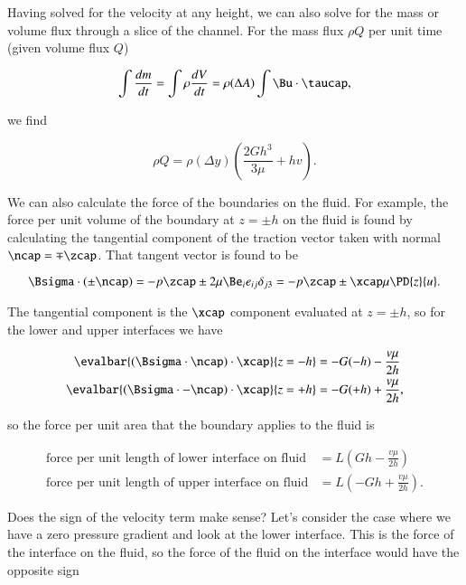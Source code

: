 Having solved for the velocity at any height, we can also solve for the mass or volume flux through a slice of the channel.  For the mass flux $\rho Q$ per unit time (given volume flux $Q$)

\begin{equation}\label{eqn:continuumFluidsReview:1350}
\int \frac{dm}{dt} 
=
\int \rho \frac{dV}{dt} 
=
\rho (\Delta A) \int \Bu \cdot \taucap,
\end{equation}

we find 

\begin{equation}\label{eqn:continuumFluidsReview:1370}
\rho Q =
\rho (\Delta y) \left( 
\frac{2 G h^3}{3 \mu} + h v
\right).
\end{equation}

We can also calculate the force of the boundaries on the fluid.  For example, the force per unit volume of the boundary at $z = \pm h$ on the fluid is found by calculating the tangential component of the traction vector taken with normal $\ncap = \mp \zcap$.  That tangent vector is found to be

\begin{equation}\label{eqn:continuumFluidsReview:1390}
\Bsigma \cdot (\pm \ncap) = -p \zcap \pm 2 \mu \Be_i e_{ij} \delta_{j 3} = - p \zcap \pm \xcap \mu \PD{z}{u}.
\end{equation}

The tangential component is the $\xcap$ component evaluated at $z = \pm h$, so for the lower and upper interfaces we have

\begin{align}\label{eqn:continuumFluidsReview:1410}
\evalbar{(\Bsigma \cdot \ncap) \cdot \xcap}{z = -h} &= -G (-h) - \frac{v \mu}{2 h} \\
\evalbar{(\Bsigma \cdot -\ncap) \cdot \xcap}{z = +h} &= -G (+h) + \frac{v \mu}{2 h},
\end{align}

so the force per unit area that the boundary applies to the fluid is

\begin{align}\label{eqn:continuumFluidsReview:1430}
\text{force per unit length of lower interface on fluid} &= L \left( G h - \frac{v \mu}{2 h} \right) \\
\text{force per unit length of upper interface on fluid} 
&= L \left( -G h + \frac{v \mu}{2 h} \right).
\end{align}

Does the sign of the velocity term make sense?  Let's consider the case where we have a zero pressure gradient and look at the lower interface.  This is the force of the interface on the fluid, so the force of the fluid on the interface would have the opposite sign

